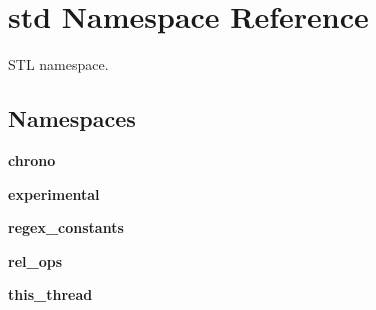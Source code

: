 \hypertarget{namespacestd}{}\section{std Namespace Reference}
\label{namespacestd}


S\+TL namespace.  


\subsection*{Namespaces}
\begin{DoxyCompactItemize}
\item 
 \textbf{ chrono}
\item 
 \textbf{ experimental}
\item 
 \textbf{ regex\+\_\+constants}
\item 
 \textbf{ rel\+\_\+ops}
\item 
 \textbf{ this\+\_\+thread}
\end{DoxyCompactItemize}
